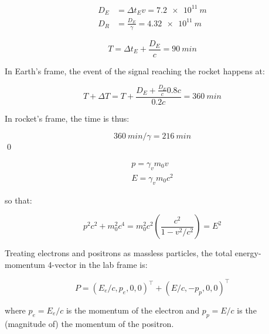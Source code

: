 \documentclass[12pt]{article}
\begin{document}

\begin{equation}
\begin{split}
    D_{E} &= \Delta t_{E} v = \qty{7.2e11}{m} \\
    D_{R} &= \frac{D_{E}}{\gamma} = \qty{4.32e11}{m}
\end{split}
\end{equation}


\begin{equation}
    T = \Delta t_{E} + \frac{D_{E}}{c} = \qty{90}{min}
\end{equation}

In Earth's frame, the event of the signal reaching the rocket happens at:

\begin{equation}
    T + \Delta T = T + \frac{D_{E} + \frac{D_{E}}{c} 0.8 c}{0.2c} = \qty{360}{min}
\end{equation}

In rocket's frame, the time is thus:

\begin{equation}
    \qty{360}{min}/\gamma = \qty{216}{min}
\end{equation}
\qed



\begin{equation}
\begin{split}
    p = \gamma_{v} m_{0} v \\
    E = \gamma_{v} m_{0} c^{2}
\end{split}
\end{equation}

so that:

\begin{equation}
    p^{2}c^{2} + m_{0}^{2}c^{4} = m_{0}^{2}c^{2} \left( \frac{c^{2}}{1 - v^{2}/c^{2}} \right) = E^{2}
\end{equation}

Treating electrons and positrons as massless particles, the total energy-momentum 4-vector in the lab frame is:

\begin{equation}
    P = (E_{e}/c, p_{e}, 0, 0)^{\intercal} + (E/c, -p_{p}, 0, 0)^{\intercal}
\end{equation}

where $p_{e} = E_{e}/c$ is the momentum of the electron and $p_{p} = E/c$ is the (magnitude of) the momentum of the positron.
\end{document}

